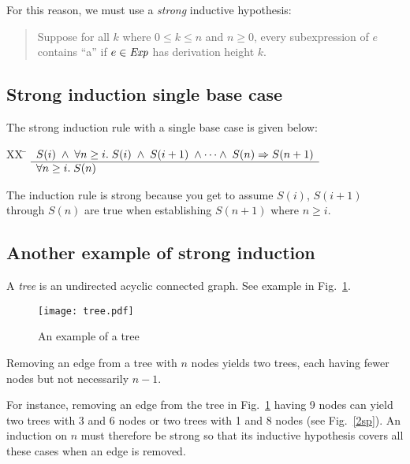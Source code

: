 \documentclass[12pt]{article}
\newcommand{\id}[1]{\mbox{\it #1\/}}
\begin{document}
For this reason, we must use a {\em strong\/} inductive hypothesis:

\begin{quote}
Suppose for all $k$ where $0\leq k\leq n$ and $n\geq 0$,
every subexpression of $e$ contains ``a'' if $e\in\id{Exp}$ has derivation height $k$.
\end{quote}

\subsection{Strong induction single base case}

The strong induction rule with a single base case is given below:
\begin{tabbing}
[2]XX \=  \kill
[2] \>
	\(\begin{array}[t]{l}
	S(i) \;\wedge\; \forall n \geq i.\;S(i)\;\wedge\;S(i+1)\;\wedge\cdots\wedge\;S(n) \Rightarrow S(n+1) \\
	\hline
	\forall n \geq i. \; S(n)
	\end{array}\)
\end{tabbing}
The induction rule is strong because you get to assume
$S(i)$, $S(i+1)$ through $S(n)$ are true when establishing $S(n+1)$ where $n\geq i$.

\subsection{Another example of strong induction}

\noindent A {\em tree\/} is an undirected acyclic connected graph.
See example in Fig.\ \ref{sp}.

\begin{figure}[h]
\centering
\texttt{[image: tree.pdf]}
\caption{An example of a tree}
\label{sp}
\end{figure}

\vspace{0.5em}

\noindent Removing an edge from a tree with $n$ nodes yields two trees, each 
having fewer nodes but not necessarily $n-1$.

\vspace{0.5em}
\noindent For instance, removing an edge from the tree in Fig.\ \ref{sp} having 9 nodes can yield 
two trees with 3 and 6 nodes or two trees with 1 and 8 nodes (see Fig.~\ref{2sp}).
An induction on $n$ must therefore be strong so that its inductive hypothesis
covers all these cases when an edge is removed.
\end{document}
